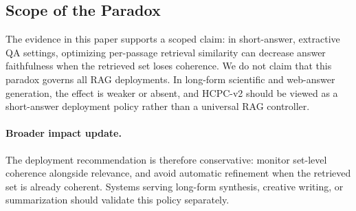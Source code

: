 
\subsection{Scope of the Paradox}
\label{sec:fix10_scope}


The evidence in this paper supports a scoped claim: in short-answer,
extractive QA settings, optimizing per-passage retrieval similarity can
decrease answer faithfulness when the retrieved set loses coherence. We do
not claim that this paradox governs all RAG deployments. In long-form
scientific and web-answer generation, the effect is weaker or absent, and
HCPC-v2 should be viewed as a short-answer deployment policy rather than a
universal RAG controller.

\paragraph{Broader impact update.}
The deployment recommendation is therefore conservative: monitor set-level
coherence alongside relevance, and avoid automatic refinement when the
retrieved set is already coherent. Systems serving long-form synthesis,
creative writing, or summarization should validate this policy separately.
